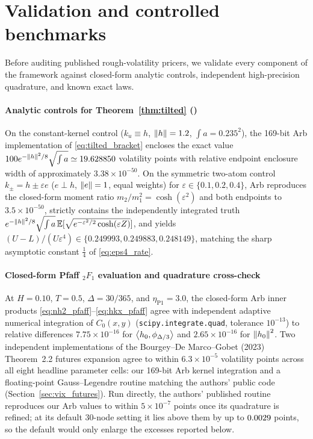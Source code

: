 \section{Validation and controlled benchmarks}\label{sec:validation}

Before auditing published rough-volatility pricers, we validate every component of the framework against
closed-form analytic controls, independent high-precision quadrature, and known exact laws.

\paragraph{Analytic controls for Theorem~\ref{thm:tilted} (\textnormal{})}
On the constant-kernel control ($k_u\equiv h$, $\left\lVert h\right\rVert=1.2$, $\int a=0.235^2$), the 169-bit Arb
implementation of \eqref{eq:tilted_bracket} encloses the exact value
$100e^{-\left\lVert h\right\rVert^2/8}\sqrt{\int a}\simeq19.628850$ volatility points with relative endpoint enclosure width of approximately
$3.38\times10^{-50}$. On the symmetric two-atom control $k_\pm=h\pm\varepsilon e$ ($e\perp h$,
$\left\lVert e\right\rVert=1$, equal weights) for $\varepsilon\in\{0.1,0.2,0.4\}$, Arb reproduces the closed-form moment
ratio $m_2/m_1^2=\cosh(\varepsilon^2)$ and both endpoints to $3.5\times10^{-50}$, strictly contains the
independently integrated truth $e^{-\left\lVert h\right\rVert^2/8}\sqrt{\int a}\,\mathbb{E}[\sqrt{e^{-\varepsilon^2/2}\cosh(\varepsilon Z)}]$,
and yields $(U-L)/(U\varepsilon^4)\in\{0.249993,0.249883,0.248149\}$, matching the sharp asymptotic
constant $\tfrac14$ of \eqref{eq:eps4_rate}.

\paragraph{Closed-form Pfaff ${}_2F_1$ evaluation and quadrature cross-check}
At $H=0.10$, $T=0.5$, $\Delta=30/365$, and $\eta_{\mathrm{P1}}=3.0$, the closed-form Arb inner products
\eqref{eq:nh2_pfaff}--\eqref{eq:hkx_pfaff} agree with independent adaptive numerical integration of
$C_0(x,y)$ (\texttt{scipy.integrate.quad}, tolerance $10^{-13}$) to relative differences
$7.75\times10^{-16}$ for $\left\langle h_0,\phi_{\Delta/3}\right\rangle$ and $2.65\times10^{-16}$ for $\left\lVert h_0\right\rVert^2$.
Two independent implementations of the Bourgey--De Marco--Gobet (2023) Theorem~2.2 futures expansion agree
to within $6.3\times10^{-5}$ volatility points across all eight headline parameter cells: our 169-bit Arb
kernel integration and a floating-point Gauss--Legendre routine matching the authors' public code
(Section~\ref{sec:vix_futures}). Run directly, the authors' published routine reproduces our Arb values to
within $5\times10^{-7}$ points once its quadrature is refined; at its default $30$-node setting it lies above
them by up to $0.0029$ points, so the default would only enlarge the excesses reported below.

